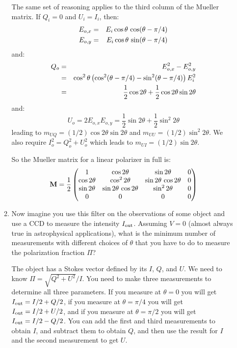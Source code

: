 \documentclass[11pt, preprint]{article}
\begin{document}
\begin{enumerate}
\begin{enumerate}
\begin{answer}
    The same set of reasoning applies to the third column of the
    Mueller matrix. If $Q_i=0$ and $U_i = I_i$, then:
    \begin{eqnarray}
      E_{o, x} &=& E_i \cos\theta\, \cos(\theta - \pi/4) \cr
      E_{o, y} &=& E_i \cos\theta\, \sin(\theta - \pi/4)
    \end{eqnarray}
    and: 
    \begin{eqnarray}
      Q_o &=& E_{o,x}^2 - E_{o,y}^2 \cr
      &=& \cos^2\theta
      \left(\cos^2(\theta-\pi/4) -
      \sin^2(\theta-\pi/4) \right) E_i^2 \cr
      &=& \frac{1}{2}\cos 2\theta +
      \frac{1}{2}\cos 2\theta\sin 2\theta
    \end{eqnarray}
    and:
    \begin{equation}
      U_o = 2 E_{o,x} E_{o,y} = \frac{1}{2} \sin 2\theta +
      \frac{1}{2}\sin^2 2\theta
    \end{equation}
    leading to $m_{UQ} = (1/2)\cos 2\theta \sin 2\theta$ and $m_{UU} =
    (1/2) \sin^2 2\theta$.
    We also require
    $I_o^2 = Q_o^2 + U_o^2$ which leads to $m_{UI} = (1/2) \sin
    2\theta$.

    So the Mueller matrix for a linear polarizer in full is:
    \begin{equation}
      {\bf M} = \frac{1}{2} \begin{pmatrix}
        1 & \cos 2\theta & \sin 2\theta & 0 \\
        \cos 2\theta & \cos^2 2\theta & \sin 2\theta\, \cos 2\theta& 0 \\
        \sin 2\theta & \sin 2\theta\, \cos 2\theta& \sin^2 2\theta & 0 \\
        0 & 0 & 0 & 0
      \end{pmatrix}
    \end{equation}
  \end{answer}

  \item Now imagine you use this filter on the observations of some
    object and use a CCD to measure the intensity $I_{\rm
      out}$. Assuming $V=0$ (almost always true in astrophysical
    applications), what is the minimum number of measurements with
    different choices of $\theta$ that you have to do to measure the
    polarization fraction $\Pi$?

    \begin{answer}
      The object has a Stokes vector defined by its $I$, $Q$, and
      $U$. We need to know $\Pi = \sqrt{Q^2 + U^2}/I$. You need to
      make three measurements to determine all three parameters. If
      you measure at $\theta=0$ you will get $I_{\rm out} = I/2 +
      Q/2$, if you measure at $\theta = \pi/4$ you will get $I_{\rm
        out} = I/2 + U/2$, and if you measure at $\theta = \pi/2$ you
      will get $I_{\rm out} = I/2 - Q/2$. You can add the first
      and third measurements to obtain $I$, and subtract them to obtain
      $Q$, and then use the result for $I$ and the second measurement
      to get $U$.
    \end{answer}


\end{enumerate}
\end{enumerate}
\end{document}

